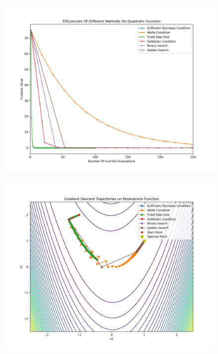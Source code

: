 \documentclass{article}
\newcommand*{\1}{\mathbf{1}}
\begin{document}
\begin{figure}[H]
    \centering
    \includegraphics[scale=0.8]{quadratic_efficiencies.png}
\end{figure}

\begin{figure}[H]
    \centering
    \includegraphics[scale=0.8]{rosenbrock.png}
\end{figure}
\end{document}
